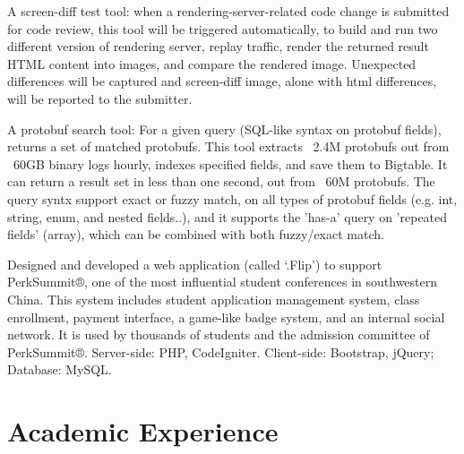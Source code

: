 \documentclass[]{deedy-resume-openfont}
\begin{document}
\begin{tightemize}
\item A screen-diff test tool: when a rendering-server-related code change is submitted for code review, this tool will be triggered automatically, to build and run two different version of rendering server, replay traffic, render the returned result HTML content into images, and compare the rendered image. Unexpected differences will be captured and screen-diff image, alone with html differences, will be reported to the submitter.
\item A protobuf search tool: For a given query (SQL-like syntax on protobuf fields), returns a set of matched protobufs. This tool extracts ~2.4M protobufs out from ~60GB binary logs hourly, indexes specified fields, and save them to Bigtable. It can return a result set in less than one second, out from ~60M protobufs. The query syntx support exact or fuzzy match, on all types of protobuf fields (e.g. int, string, enum, and nested fields..), and it supports the 'has-a' query on 'repeated fields' (array), which can be combined with both fuzzy/exact match.
\end{tightemize}
\sectionsep


Designed and developed a web application (called ‘.Flip’) to support PerkSummit®, one of the most influential student conferences in southwestern China.
This system includes student application management system, class enrollment, payment interface, a game-like badge system, and an internal social network.
It is used by thousands of students and the admission committee of PerkSummit®.
Server-side: PHP, CodeIgniter. Client-side: Bootstrap, jQuery; Database: MySQL.
\sectionsep



\section{Academic Experience}

\end{document}
